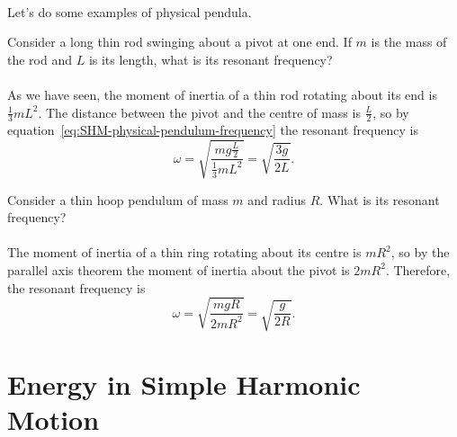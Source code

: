 \documentclass[../classical_mechanics.tex]{subfiles}
\begin{document}
        \paragraph{}
        Let's do some examples of physical pendula.
        \begin{example}
            Consider a long thin rod swinging about a pivot at one end.
            If $m$ is the mass of the rod and $L$ is its length, what is its resonant frequency?

            \paragraph{}
            As we have seen, the moment of inertia of a thin rod rotating about its end is $\frac{1}{3}mL^2$.
            The distance between the pivot and the centre of mass is $\frac{L}{2}$, so by equation~\ref{eq:SHM-physical-pendulum-frequency} the resonant frequency is
            \begin{equation}
                \omega=\sqrt{\frac{mg\frac{L}{2}}{\frac{1}{3}mL^2}}=\sqrt{\frac{3g}{2L}}.
            \end{equation}
        \end{example}
        \begin{example}
            Consider a thin hoop pendulum of mass $m$ and radius $R$.
            What is its resonant frequency?

            \paragraph{}
            The moment of inertia of a thin ring rotating about its centre is $mR^2$, so by the parallel axis theorem the moment of inertia about the pivot is $2mR^2$.
            Therefore, the resonant frequency is
            \begin{equation}
                \omega=\sqrt{\frac{mgR}{2mR^2}}=\sqrt{\frac{g}{2R}}.
            \end{equation}
        \end{example}

    \section{Energy in Simple Harmonic Motion}
\end{document}
